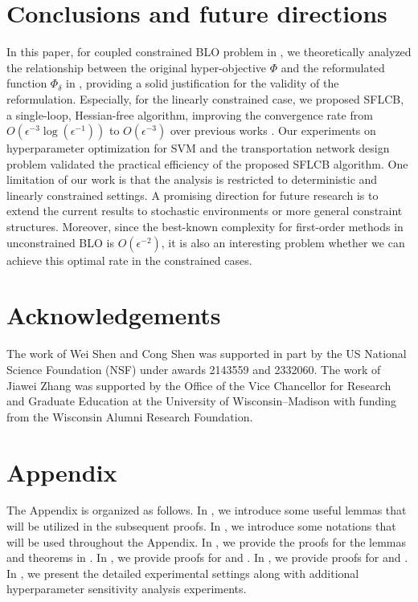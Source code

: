 \documentclass{article}
\theoremstyle{plain}
\theoremstyle{definition}
\theoremstyle{remark}
\begin{document}
\section{Conclusions and future directions}\label{section: conclusion}
In this paper, for coupled constrained BLO problem in , we theoretically analyzed the relationship between the original
hyper-objective $\Phi$ and the reformulated function $\Phi_\delta$ in , providing a solid justification for the validity of the reformulation. Especially, for the linearly constrained case, we proposed SFLCB, a single-loop, Hessian-free algorithm, improving the convergence rate from $O(\epsilon^{-3}\log(\epsilon^{-1}))$ to $O(\epsilon^{-3})$ over previous works \cite{kwon2023penalty, jiang2024primal}. Our experiments on hyperparameter optimization for SVM and the transportation network design problem validated the practical efficiency of the proposed SFLCB algorithm. One limitation of our work is that the analysis is restricted to deterministic and linearly constrained settings. A promising direction for future research is to extend the current results to stochastic environments or more general constraint structures. Moreover, since the best-known complexity for first-order methods in unconstrained BLO \citep{huang2024optimal} is $O(\epsilon^{-2})$, it is also an interesting problem whether we can achieve this optimal rate in the constrained cases.


\section*{Acknowledgements}
The work of Wei Shen and Cong Shen was supported in part by the US National Science Foundation (NSF) under awards 2143559 and 2332060. The work of Jiawei Zhang was supported by the Office of the Vice Chancellor for Research and Graduate Education at the University of Wisconsin–Madison with funding from the Wisconsin Alumni Research Foundation.








\newpage
\appendix

\section*{Appendix}

The Appendix is organized as follows. In , we 
introduce some useful lemmas that will be utilized in the subsequent proofs. In , we introduce some notations that will be used throughout the Appendix. In , we provide the proofs for the lemmas and theorems in . In , we provide proofs for  and . In , we provide proofs for  and . In , we present the detailed experimental settings along with additional hyperparameter sensitivity analysis experiments.
\end{document}
